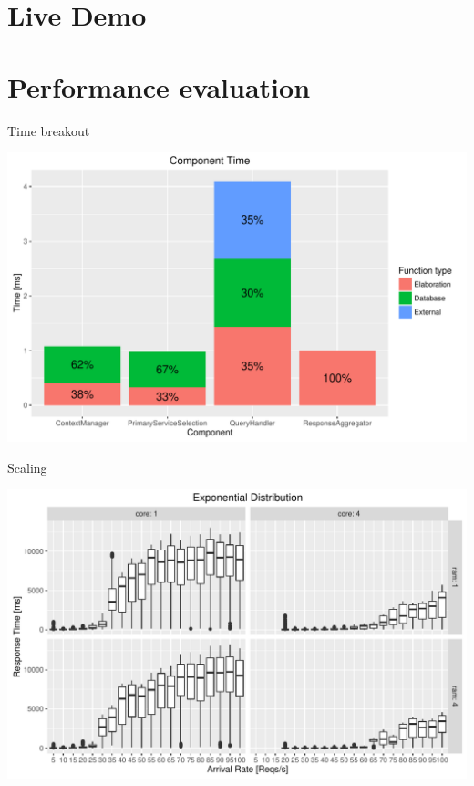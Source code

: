 \documentclass[smaller]{beamer}
\begin{document}
\section{Live Demo}
\label{sec:orgheadline25}

\section{Performance evaluation}
\label{sec:orgheadline28}
\begin{frame}[label={sec:orgheadline26}]{Time breakout}
\begin{center}
\includegraphics{./images/component_time.pdf}
\end{center}
\end{frame}

\begin{frame}[label={sec:orgheadline27}]{Scaling}
\begin{center}
\includegraphics{./images/exponential_analysis.pdf}
\end{center}
\end{frame}
\end{document}
